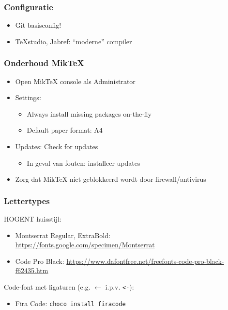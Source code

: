 \documentclass[aspectratio=169]{beamer}
\begin{document}
\begin{frame}
  \frametitle{Configuratie}

  \begin{itemize}
    \item Git basisconfig!
    \item {\TeX}studio, Jabref: ``moderne'' compiler
  \end{itemize}
\end{frame}

\begin{frame}
  \frametitle{Onderhoud Mik{\TeX}}

  \begin{itemize}
    \item Open Mik{\TeX} console als Administrator
    \item Settings:
          \begin{itemize}
            \item Always install missing packages on-the-fly
            \item Default paper format: A4
          \end{itemize}
    \item Updates: Check for updates
          \begin{itemize}
            \item In geval van fouten: installeer updates
          \end{itemize}
    \item Zorg dat Mik{\TeX} niet geblokkeerd wordt door firewall/antivirus
  \end{itemize}
\end{frame}

\begin{frame}[fragile]
  \frametitle{Lettertypes}

  HOGENT huisstijl:

  \begin{itemize}
    \item Montserrat Regular, ExtraBold: \url{https://fonts.google.com/specimen/Montserrat}
    \item Code Pro Black: \url{https://www.dafontfree.net/freefonts-code-pro-black-f62435.htm}
  \end{itemize}

  Code-font met ligaturen (e.g. \({\leftarrow}\) i.p.v. \verb|<-|):

  \begin{itemize}
    \item Fira Code: \texttt{choco install firacode}
  \end{itemize}
\end{frame}
\end{document}
